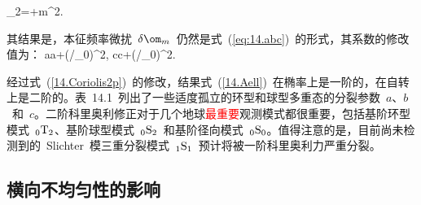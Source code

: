 \eq \label{14.Coriolis2}
\xi_2=\lambda+m^2\zeta.
\en

其结果是，本征频率微扰~$\delta\om_m$~仍然是式~(\ref{eq:14.abc})~的形式，其系数的修改值为：
\eq \label{14.Coriolis2p}
a\rightarrow a+\lambda(\Omega/\om_0)^2,\qquad
c\rightarrow c+\zeta(\Omega/\om_0)^2.
\en

经过式~(\ref{14.Coriolis2p})~的修改，结果式~(\ref{14.Aell})~在椭率上是一阶的，在自转上是二阶的。表~14.1~列出了一些适度孤立的环型和球型多重态的分裂参数~$a$、$b$~和~$c$。二阶科里奥利修正对于几个地球\textcolor{red}{最重要}观测模式都很重要，包括基阶环型模式~${}_0{\rm T}_2$、基阶球型模式~${}_0{\rm S}_2$~和基阶径向模式~${}_0{\rm S}_0$。值得注意的是，目前尚未检测到的~Slichter~模三重分裂模式~${}_1{\rm S}_1$~预计将被一阶科里奥利力严重分裂。
%
%
%
%

\subsection{横向不均匀性的影响}
%


